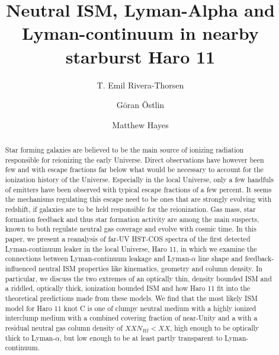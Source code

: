 \documentclass[preprint2]{aastex6}
\begin{document}
\title{Neutral ISM, Lyman-Alpha and Lyman-continuum in nearby starburst Haro 11\footnotemark[1]}

\author{T. Emil Rivera-Thorsen}

\author{Göran Östlin}

\author{Matthew Hayes}



\begin{abstract}
Star forming galaxies are believed to be the main source of ionizing
radiation responsible for reionizing the early Universe. Direct
observations have however been few and with escape fractions far below
what would be necessary to account for the ionization history of the
Universe. Especially in the local Universe, only a few handfuls of
emitters have been observed with typical escape fractions of a few
percent. It seems the mechanisms regulating this escape need to be ones
that are strongly evolving with redshift, if galaxies are to be held
responsible for the reionization. Gas mass, star formation feedback and
thus star formation activity are among the main suspects, known to both
regulate neutral gas coverage and evolve with cosmic time. In this
paper, we present a reanalysis of far-UV HST-COS spectra of the first
detected Lyman-continuum leaker in the local Universe, Haro 11, in which
we examine the connections between Lyman-continuum leakage and
Lyman-$\alpha$ line shape and feedback-influenced neutral ISM properties
like kinematics, geometry and column density. In particular, we discuss
the two extremes of an optically thin, density bounded ISM and a
riddled, optically thick, ionization bounded ISM and how Haro 11 fit
into the theoretical predictions made from these models. We find that
the most likely ISM model for Haro 11 knot C is one of clumpy neutral
medium with a highly ionized interclump medium with a combined covering
fraction of near-Unity and a with a residual neutral gas column density
of $XX N_{HI} < XX$, high enough to be optically thick to
Lyman-$\alpha$, but low enough to be at least partly transparent to
Lyman-continuum.
\end{abstract}
\end{document}

